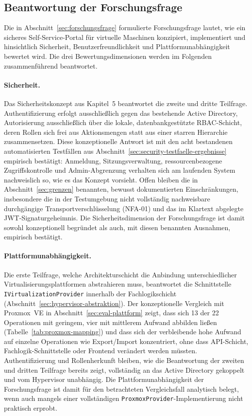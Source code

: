 \documentclass[12pt,a4paper]{article}
\begin{document}
\subsection{Beantwortung der Forschungsfrage}
\label{sec:forschungsfrage-antwort}

Die in Abschnitt~\ref{sec:forschungsfrage} formulierte Forschungsfrage lautet, wie ein sicheres Self-Service-Portal für virtuelle Maschinen konzipiert, implementiert und hinsichtlich Sicherheit, Benutzerfreundlichkeit und Plattformunabhängigkeit bewertet wird. Die drei Bewertungsdimensionen werden im Folgenden zusammenführend beantwortet.

\paragraph{Sicherheit.} Das Sicherheitskonzept aus Kapitel~5 beantwortet die zweite und dritte Teilfrage. Authentifizierung erfolgt ausschließlich gegen das bestehende Active Directory, Autorisierung ausschließlich über die lokale, datenbankgestützte RBAC-Schicht, deren Rollen sich frei aus Aktionsmengen statt aus einer starren Hierarchie zusammensetzen. Diese konzeptionelle Antwort ist mit den acht bestandenen automatisierten Testfällen aus Abschnitt~\ref{sec:security-testfaelle-ergebnisse} empirisch bestätigt: Anmeldung, Sitzungsverwaltung, ressourcenbezogene Zugriffskontrolle und Admin-Abgrenzung verhalten sich am laufenden System nachweislich so, wie es das Konzept vorsieht. Offen bleiben die in Abschnitt~\ref{sec:grenzen} benannten, bewusst dokumentierten Einschränkungen, insbesondere die in der Testumgebung nicht vollständig nachweisbare durchgängige Transportverschlüsselung (NFA-01) und das im Klartext abgelegte JWT-Signaturgeheimnis. Die Sicherheitsdimension der Forschungsfrage ist damit sowohl konzeptionell begründet als auch, mit diesen benannten Ausnahmen, empirisch bestätigt.

\paragraph{Plattformunabhängigkeit.} Die erste Teilfrage, welche Architekturschicht die Anbindung unterschiedlicher Virtualisierungsplattformen abstrahieren muss, beantwortet die Schnittstelle \texttt{IVirtualizationProvider} innerhalb der Fachlogikschicht (Abschnitt~\ref{sec:hypervisor-abstraktion}). Der konzeptionelle Vergleich mit Proxmox~VE in Abschnitt~\ref{sec:eval-plattform} zeigt, dass sich 13 der 22 Operationen mit geringem, vier mit mittlerem Aufwand abbilden ließen (Tabelle~\ref{tab:proxmox-mapping}) und dass sich der verbleibende hohe Aufwand auf einzelne Operationen wie Export/Import konzentriert, ohne dass API-Schicht, Fachlogik-Schnittstelle oder Frontend verändert werden müssten. Authentifizierung und Rollenherkunft bleiben, wie die Beantwortung der zweiten und dritten Teilfrage bereits zeigt, vollständig an das Active Directory gekoppelt und vom Hypervisor unabhängig. Die Plattformunabhängigkeit der Forschungsfrage ist damit für den betrachteten Vergleichsfall analytisch belegt, wenn auch mangels einer vollständigen \texttt{ProxmoxProvider}-Implementierung nicht praktisch erprobt.
\end{document}
